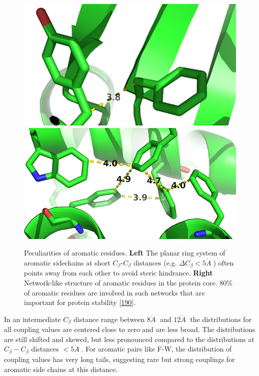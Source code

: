 \documentclass[11pt,a4paper,twoside]{book}
\newcommand{\Cb}{C_\beta}
\newcommand{\angstrom}{\mathring{A} \;}
\theoremstyle{definition}
\theoremstyle{definition}
\theoremstyle{remark}
\begin{document}
\begin{figure}
\includegraphics[width=0.5\linewidth]{img/coupling_matrix_analysis/aromatic_residues_short_distance} \includegraphics[width=0.5\linewidth]{img/coupling_matrix_analysis/aromatic_bundle} \caption{Peculiarities of aromatic
residues. \textbf{Left} The planar ring system of aromatic sidechains at
short \(\Cb\)-\(\Cb\) distances (e.g. \(\Delta \Cb < 5 \angstrom\))
often points away from each other to avoid steric hindrance.
\textbf{Right} Network-like structure of aromatic residues in the
protein core. 80\% of aromatic residues are involved in such networks
that are important for protein stability
{[}\protect\hyperlink{ref-Burley1985}{190}{]}.}\label{fig:aromatic-residue-properties}
\end{figure}

In an intermediate \(\Cb\) distance range between \(8\angstrom\) and
\(12\angstrom\) the distributions for all coupling values are centered
close to zero and are less broad. The distributions are still shifted
and skewed, but less pronounced compared to the distributions at
\(\Cb-\Cb\) distances \(< 5\angstrom\). For aromatic pairs like F-W, the
distribution of coupling values has very long tails, suggesting rare but
strong couplings for aromatic side chains at this distance.
\end{document}
